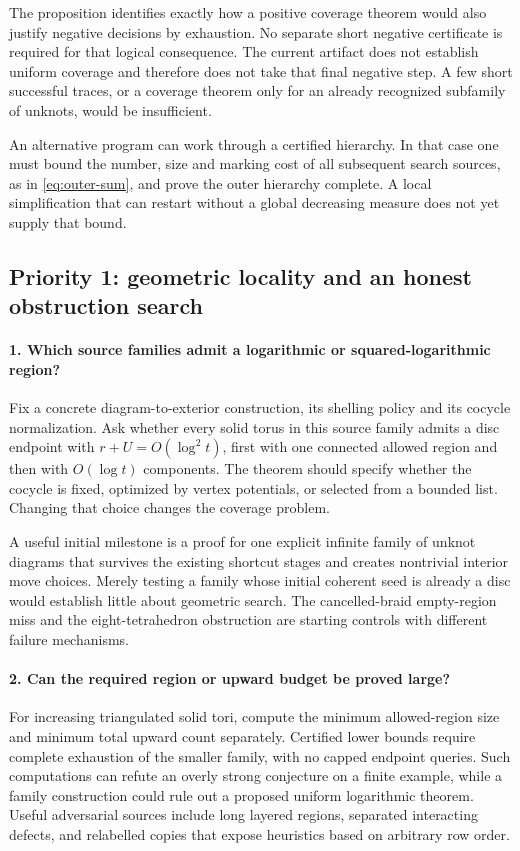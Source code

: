 The proposition identifies exactly how a positive coverage theorem would
also justify negative decisions by exhaustion. No separate short negative
certificate is required for that logical consequence. The current artifact
does not establish uniform coverage and therefore does not take that final
negative step. A few short successful traces, or a coverage theorem only for
an already recognized subfamily of unknots, would be insufficient.

An alternative program can work through a certified hierarchy. In that case
one must bound the number, size and marking cost of all subsequent search
sources, as in \eqref{eq:outer-sum}, and prove the outer hierarchy complete.
A local simplification that can restart without a global decreasing measure
does not yet supply that bound.

\subsection{Priority 1: geometric locality and an honest obstruction search}

\paragraph{1. Which source families admit a logarithmic or squared-logarithmic region?}
Fix a concrete diagram-to-exterior construction, its shelling policy and
its cocycle normalization. Ask whether every solid torus in this source
family admits a disc endpoint with $r+U=O(\log^2 t)$, first with one connected
allowed region and then with $O(\log t)$ components. The theorem should
specify whether the cocycle is fixed, optimized by vertex potentials, or
selected from a bounded list. Changing that choice changes the coverage
problem.

A useful initial milestone is a proof for one explicit infinite family of
unknot diagrams that survives the existing shortcut stages and creates
nontrivial interior move choices. Merely testing a family whose initial
coherent seed is already a disc would establish little about geometric
search. The cancelled-braid empty-region miss and the eight-tetrahedron
obstruction are starting controls with different failure mechanisms.

\paragraph{2. Can the required region or upward budget be proved large?}
For increasing triangulated solid tori, compute the minimum allowed-region
size and minimum total upward count separately. Certified lower bounds
require complete exhaustion of the smaller family, with no capped endpoint
queries. Such computations can refute an overly strong conjecture on a
finite example, while a family construction could rule out a proposed
uniform logarithmic theorem. Useful adversarial sources include long layered
regions, separated interacting defects, and relabelled copies that expose
heuristics based on arbitrary row order.

